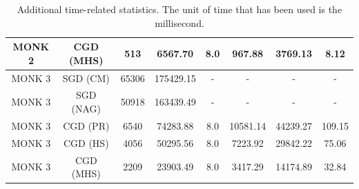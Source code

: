 \begin{table}[H]
\begin{subtable}{\textwidth}
{\begin{tabular}{| c | c | c | c | c | c | c | c |}
                            \hline
                            MONK 2 &  CGD (MHS) &               513 &       6567.70 &            8.0 &    967.88 &   3769.13 &      8.12 \\
                            \hline
                            \hline
                            MONK 3 &   SGD (CM) &             65306 &     175429.15 &              - &         - &         - &         - \\
                            \hline
                            MONK 3 &  SGD (NAG) &             50918 &     163439.49 &              - &         - &         - &         - \\
                            \hline
                            MONK 3 &   CGD (PR) &              6540 &      74283.88 &            8.0 &  10581.14 &  44239.27 &    109.15 \\
                            \hline
                            MONK 3 &   CGD (HS) &              4056 &      50295.56 &            8.0 &   7223.92 &  29842.22 &     75.06 \\
                            \hline
                            \rowcolor[gray]{.9}
                            MONK 3 &  CGD (MHS) &              2209 &      23903.49 &            8.0 &   3417.29 &  14174.89 &     32.84 \\
                            \hline
                        \end{tabular}
                    }
                \end{subtable}
                \caption{Additional time-related statistics. The unit of time that has been used is the
                millisecond.}
                \label{tab:monks_additional_no_max_epochs}
            \end{table}

